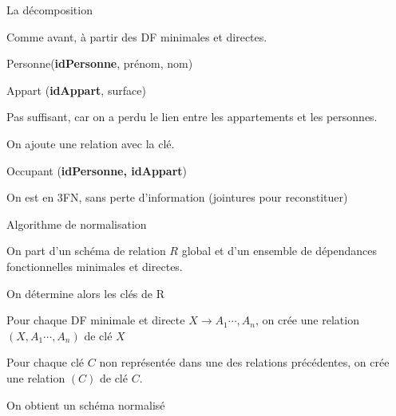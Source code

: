 \begin{frame}{La décomposition}

Comme avant, à partir des DF minimales et directes.

\vfill


\begin{redbullet}
  \item Personne(\textbf{idPersonne}, prénom, nom)
  \item Appart (\textbf{idAppart}, surface)
\end{redbullet}

\vfill

\alert{Pas suffisant}, car on a perdu le lien entre les appartements et les personnes.

\vfill
On ajoute une relation avec la clé.

\begin{redbullet}
  \item Occupant (\textbf{idPersonne, idAppart})
\end{redbullet}

\vfill
\begin{blocgauche}
\alert{On est en 3FN, sans perte d'information (jointures pour reconstituer)}
\end{blocgauche}
\end{frame}

\begin{frame}{Algorithme de normalisation}

On part d’un schéma de relation $R$ \alert{global}
et d’un ensemble de dépendances fonctionnelles minimales et directes.

\vfill

On détermine alors les clés de R

\vfill 
\begin{redbullet}
  \item Pour chaque DF minimale et directe $X \to A_1 \cdots, A_n$,
      on crée une relation $(X,A_1 \cdots, A_n)$ de clé $X$
  \item Pour chaque clé $C$
non représentée dans une des relations précédentes, on crée une relation $(C)$ de clé $C$.
\end{redbullet}

\vfill

\begin{blocgauche}
\alert{On obtient un schéma normalisé}
\end{blocgauche}
\end{frame}


